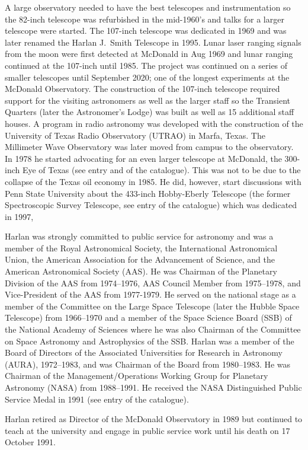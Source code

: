 A large observatory needed to have the best telescopes and
instrumentation so the 82-inch telescope was refurbished in the
mid-1960's and talks for a larger telescope were started.  The
107-inch telescope was dedicated in 1969 and was later renamed the
Harlan J.~Smith Telescope in 1995. Lunar laser ranging signals from
the moon were first detected at McDonald in Aug 1969 and lunar
ranging continued at the 107-inch until 1985. The project was
continued on a series of smaller telescopes until September 2020; one
of the longest experiments at the McDonald Observatory. The
construction of the 107-inch telescope required support for the
visiting astronomers as well as the larger staff so the Transient
Quarters (later the Astronomer's Lodge) was built as well as 15
additional staff houses. A program in radio astronomy was developed
with the construction of the University of Texas Radio Observatory
(UTRAO) in Marfa, Texas. The Millimeter Wave Observatory was later
moved from campus to the observatory. In 1978 he started advocating
for an even larger telescope at McDonald, the 300-inch Eye of Texas
(see entry  and  of the catalogue). This was
not to be due to the collapse of the Texas oil economy in 1985. He
did, however, start discussions with Penn State University about the
433-inch Hobby-Eberly Telescope (the former Spectroscopic Survey
Telescope, see entry  of the catalogue) which was dedicated
in 1997,

Harlan was strongly committed to public service for astronomy and was
a member of the Royal Astronomical Society, the International
Astronomical Union, the American Association for the Advancement of
Science, and the American Astronomical Society (AAS). He was Chairman
of the Planetary Division of the AAS from 1974--1976, AAS Council
Member from 1975--1978, and Vice-President of the AAS from
1977-1979. He served on the national stage as a member of the
Committee on the Large Space Telescope (later the Hubble Space
Telescope) from 1966--1970 and a member of the Space Science Board
(SSB) of the National Academy of Sciences where he was also Chairman
of the Committee on Space Astronomy and Astrophysics of the
SSB. Harlan was a member of the Board of Directors of the Associated
Universities for Research in Astronomy (AURA), 1972--1983, and was
Chairman of the Board from 1980--1983. He was Chairman of the
Management/Operations Working Group for Planetary Astronomy (NASA)
from 1988--1991.  He received the NASA Distinguished Public Service
Medal in 1991 (see entry  of the catalogue).

Harlan retired as Director of the McDonald Observatory in 1989 but
continued to teach at the university and engage in public service work
until his death on 17 October 1991.


